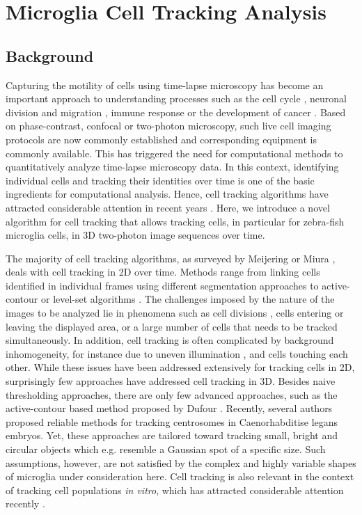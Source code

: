 \section{Microglia Cell Tracking Analysis}
\subsection{Background}
Capturing the motility of cells using time-lapse microscopy has become an important approach to understanding processes such as the cell cycle \cite{Harder:09}, neuronal division and migration \cite{Norden:09}, immune response \cite{Cahalan:08} or the development of cancer \cite{Ianzini:09}. Based on phase-contrast, confocal or two-photon microscopy, such live cell imaging protocols are now commonly established and corresponding equipment is commonly available. This has triggered the need for computational methods to quantitatively analyze time-lapse microscopy data. In this context, identifying individual cells and tracking their identities over time is one of the basic ingredients for computational analysis. Hence, cell tracking algorithms have attracted considerable attention in recent years \cite{Meijering:06,Miura:05}. Here, we introduce a novel algorithm for cell tracking that allows tracking cells, in particular for zebra-fish microglia cells, in 3D two-photon image sequences over time.

The majority of cell tracking algorithms, as surveyed by Meijering \cite{Meijering:06} or Miura \cite{Miura:05}, deals with cell tracking in 2D over time. Methods range from linking cells identified in individual frames using different segmentation approaches to active-contour \cite{dufour2005segmenting, sacan2008celltrack, Shen:06} or level-set algorithms \cite{Dzyubachyk:08, Li:08, Mukherjee:04, Nath:06}. The challenges imposed by the nature of the images to be analyzed lie in phenomena such as cell divisions \cite{AlKofahi:06, Li:08}, cells entering or leaving the displayed area, or a large number of cells that needs to be tracked simultaneously. In addition, cell tracking is often complicated by background inhomogeneity, for instance due to uneven illumination \cite{Leong:03}, and cells touching each other. While these issues have been addressed extensively for tracking cells in 2D, surprisingly few approaches have addressed cell tracking in 3D. Besides naive thresholding approaches, there are only few advanced approaches, such as the active-contour based method proposed by Dufour \cite{dufour2005segmenting}. Recently, several authors \cite{Jaensch:10, Kerekes:09} proposed reliable methods for tracking centrosomes in Caenorhabditise legans embryos. Yet, these approaches are tailored toward tracking small, bright and circular objects which e.g. resemble a Gaussian spot of a specific size. Such assumptions, however, are not satisfied by the complex and highly variable shapes of microglia under consideration here. Cell tracking is also relevant in the context of tracking cell populations \emph{in vitro}, which has attracted considerable attention recently \cite{House:09, Ong:10, Padfield:09}.
